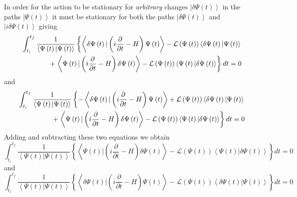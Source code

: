 \documentclass[aps,preprint]{revtex4}
\begin{document}
In order for the action to be stationary for \emph{arbitrary }changes $%
\left\vert \delta \Psi \left( t\right) \right\rangle $ in the paths $%
\left\vert \Psi \left( t\right) \right\rangle $ it must be stationary for
both the paths $\left\vert \delta \Psi \left( t\right) \right\rangle $ and $%
\left\vert i\delta \Psi \left( t\right) \right\rangle $ giving 
\begin{eqnarray}
&&\int_{t_{i}}^{t_{f}}\frac{1}{\left\langle \Psi \left( t\right) |\Psi
\left( t\right) \right\rangle }\left\{ \left\langle \delta \Psi \left(
t\right) |\left( i\frac{\partial }{\partial t}-H\right) \Psi \left( t\right)
\right\rangle -\mathcal{L}\left( \Psi \left( t\right) \right) \left\langle
\delta \Psi \left( t\right) |\Psi \left( t\right) \right\rangle \right.  
\notag \\
&&+\left. \left\langle \Psi \left( t\right) |\left( i\frac{\partial }{%
\partial t}-H\right) \delta \Psi \left( t\right) \right\rangle -\mathcal{L}%
\left( \Psi \left( t\right) \right) \left\langle \Psi \left( t\right)
|\delta \Psi \left( t\right) \right\rangle \right\} dt=0
\end{eqnarray}%
and 
\begin{eqnarray}
&&\int_{t_{i}}^{t_{f}}\frac{1}{\left\langle \Psi \left( t\right) |\Psi
\left( t\right) \right\rangle }\left\{ -\left\langle \delta \Psi \left(
t\right) |\left( i\frac{\partial }{\partial t}-H\right) \Psi \left( t\right)
\right\rangle +\mathcal{L}\left( \Psi \left( t\right) \right) \left\langle
\delta \Psi \left( t\right) |\Psi \left( t\right) \right\rangle \right.  
\notag \\
&&+\left. \left\langle \Psi \left( t\right) |\left( i\frac{\partial }{%
\partial t}-H\right) \delta \Psi \left( t\right) \right\rangle -\mathcal{L}%
\left( \Psi \left( t\right) \right) \left\langle \Psi \left( t\right)
|\delta \Psi \left( t\right) \right\rangle \right\} dt=0
\end{eqnarray}%
Adding and subtracting these two equations we obtain 
\begin{equation}
\int_{t_{i}}^{t_{f}}\frac{1}{\left\langle \Psi \left( t\right) |\Psi \left(
t\right) \right\rangle }\left\{ \left\langle \Psi \left( t\right) |\left( i%
\frac{\partial }{\partial t}-H\right) \delta \Psi \left( t\right)
\right\rangle -\mathcal{L}\left( \Psi \left( t\right) \right) \left\langle
\Psi \left( t\right) |\delta \Psi \left( t\right) \right\rangle \right\} dt=0
\label{a1}
\end{equation}%
and 
\begin{equation}
\int_{t_{i}}^{t_{f}}\frac{1}{\left\langle \Psi \left( t\right) |\Psi \left(
t\right) \right\rangle }\left\{ \left\langle \delta \Psi \left( t\right)
|\left( i\frac{\partial }{\partial t}-H\right) \Psi \left( t\right)
\right\rangle -\mathcal{L}\left( \Psi \left( t\right) \right) \left\langle
\delta \Psi \left( t\right) |\Psi \left( t\right) \right\rangle \right\} dt=0
\label{a2}
\end{equation}%
\end{document}
